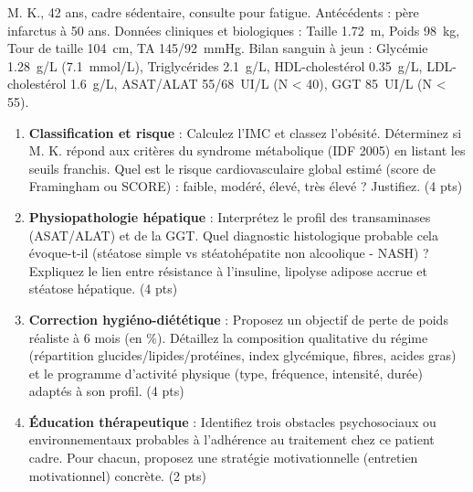 \documentclass[11pt]{article}
\begin{document}
\begin{exercice}
M. K., 42 ans, cadre sédentaire, consulte pour fatigue. Antécédents : père infarctus à 50 ans. Données cliniques et biologiques : Taille \SI{1,72}{m}, Poids \SI{98}{kg}, Tour de taille \SI{104}{cm}, TA \SI{145/92}{mmHg}. Bilan sanguin à jeun : Glycémie \SI{1,28}{g/L} (\SI{7,1}{mmol/L}), Triglycérides \SI{2,1}{g/L}, HDL-cholestérol \SI{0,35}{g/L}, LDL-cholestérol \SI{1,6}{g/L}, ASAT/ALAT \SI{55/68}{UI/L} (N < 40), GGT \SI{85}{UI/L} (N < 55).

\begin{enumerate}
    \item \textbf{Classification et risque} : Calculez l'IMC et classez l'obésité. Déterminez si M. K. répond aux critères du syndrome métabolique (IDF 2005) en listant les seuils franchis. Quel est le risque cardiovasculaire global estimé (score de Framingham ou SCORE) : faible, modéré, élevé, très élevé ? Justifiez. \hfill (4 pts)
    \item \textbf{Physiopathologie hépatique} : Interprétez le profil des transaminases (ASAT/ALAT) et de la GGT. Quel diagnostic histologique probable cela évoque-t-il (stéatose simple vs stéatohépatite non alcoolique - NASH) ? Expliquez le lien entre résistance à l'insuline, lipolyse adipose accrue et stéatose hépatique. \hfill (4 pts)
    \item \textbf{Correction hygiéno-diététique} : Proposez un objectif de perte de poids réaliste à 6 mois (en \%). Détaillez la composition qualitative du régime (répartition glucides/lipides/protéines, index glycémique, fibres, acides gras) et le programme d'activité physique (type, fréquence, intensité, durée) adaptés à son profil. \hfill (4 pts)
    \item \textbf{Éducation thérapeutique} : Identifiez trois obstacles psychosociaux ou environnementaux probables à l'adhérence au traitement chez ce patient cadre. Pour chacun, proposez une stratégie motivationnelle (entretien motivationnel) concrète. \hfill (2 pts)
\end{enumerate}
\end{exercice}
\end{document}
